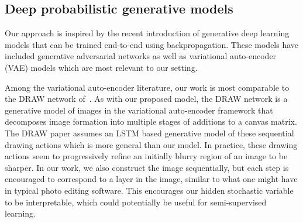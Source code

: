\label{sec:related}
\vspace{-2mm}

\subsection{Deep probabilistic generative models}
\vspace{-2mm}
Our approach is inspired by the recent introduction of generative deep learning models that can be
trained end-to-end using backpropagation.  These models have included
generative adversarial networks \citep{denton2015deep, goodfellow2014generative}
as well as variational auto-encoder (VAE) models \citep{Kingma2014,kingma2014semi,rezende2014stochastic,burda2015importance}
which are most relevant to our setting.  

Among the variational auto-encoder literature, our work is most comparable to 
the DRAW network of~\cite{gregor2015draw}.  As with our proposed model, 
the DRAW network is a generative model of images in the variational auto-encoder framework
that decomposes image formation into multiple stages of additions to a canvas matrix.  The DRAW paper assumes an LSTM based generative model of these sequential 
drawing actions which is more general than our model.
In practice, these drawing actions seem to progressively refine an initially blurry region of an image to  be sharper.
In our work, we also construct the image sequentially,
but each step is encouraged to correspond to a layer in the image,
similar to what one might have in typical photo editing software.
This encourages our hidden stochastic variable to be interpretable,
which could potentially be useful for semi-supervised learning.


\vspace{-2mm}
